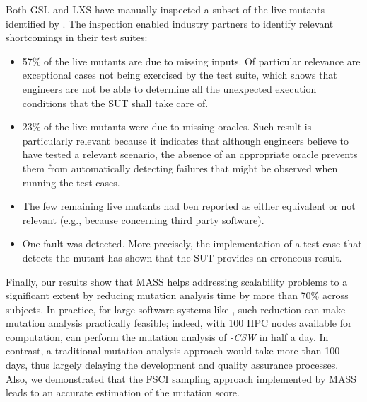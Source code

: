 Both GSL and LXS have manually inspected a subset of the live mutants identified by \MASS. The inspection enabled industry partners to identify relevant shortcomings in their test suites:
\begin{itemize}
\item 57\% of the live mutants are due to missing inputs. Of particular relevance are exceptional cases not being exercised by the test suite, which shows that engineers are not be able to determine all the unexpected execution conditions that the SUT shall take care of.
\item 23\% of the live mutants were due to missing oracles. Such result is particularly relevant because it indicates that although engineers believe to have tested a relevant scenario, the absence of an appropriate oracle prevents them from automatically detecting failures that might be observed when running the test cases.
\item The few remaining live mutants had ben reported as either equivalent or not relevant (e.g., because concerning third party software).
\item One fault was detected. More precisely, the implementation of a test case that detects the mutant has shown that the SUT provides an erroneous result.
\end{itemize}



Finally, our results show that MASS helps addressing scalability problems to a significant extent by reducing mutation analysis time by more than 70\% across subjects.
In practice, for large software systems like \SAIL{}, such reduction can make mutation analysis practically feasible; indeed, with 100 HPC nodes available for computation, \MASS can perform the mutation analysis of \SAIL{}\emph{-CSW} in half a day. In contrast, a traditional mutation analysis approach would take more than 100 days, thus largely delaying the development and quality assurance processes.
Also, we demonstrated that the FSCI sampling approach implemented by MASS leads to an accurate estimation of the mutation score.




